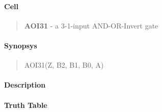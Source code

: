 \label{AOI31}
\paragraph{Cell}
\begin{quote}
    \textbf{AOI31} - a 3-1-input AND-OR-Invert gate
\end{quote}

\paragraph{Synopsys}
\begin{quote}
    AOI31(Z, B2, B1, B0, A)
\end{quote}

\paragraph{Description}

%

\paragraph{Truth Table}


